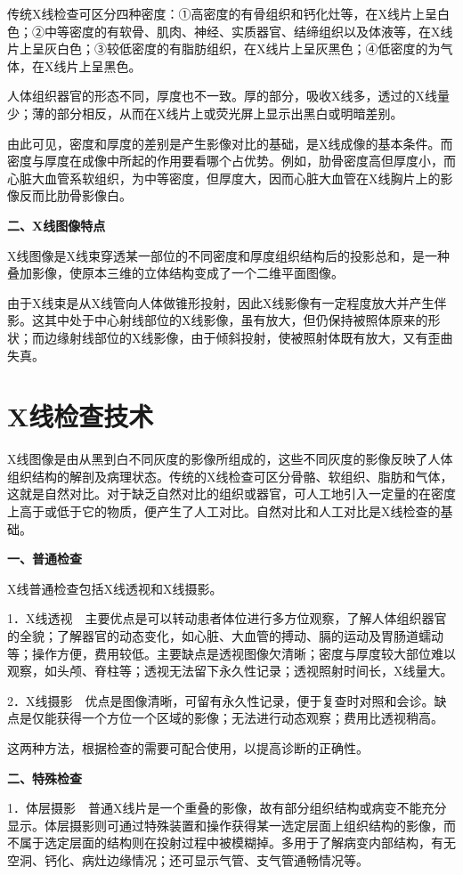 传统X线检查可区分四种密度：①高密度的有骨组织和钙化灶等，在X线片上呈白色；②中等密度的有软骨、肌肉、神经、实质器官、结缔组织以及体液等，在X线片上呈灰白色；③较低密度的有脂肪组织，在X线片上呈灰黑色；④低密度的为气体，在X线片上呈黑色。

人体组织器官的形态不同，厚度也不一致。厚的部分，吸收X线多，透过的X线量少；薄的部分相反，从而在X线片上或荧光屏上显示出黑白或明暗差别。

由此可见，密度和厚度的差别是产生影像对比的基础，是X线成像的基本条件。而密度与厚度在成像中所起的作用要看哪个占优势。例如，肋骨密度高但厚度小，而心脏大血管系软组织，为中等密度，但厚度大，因而心脏大血管在X线胸片上的影像反而比肋骨影像白。

\textbf{二、X线图像特点}

X线图像是X线束穿透某一部位的不同密度和厚度组织结构后的投影总和，是一种叠加影像，使原本三维的立体结构变成了一个二维平面图像。

由于X线束是从X线管向人体做锥形投射，因此X线影像有一定程度放大并产生伴影。这其中处于中心射线部位的X线影像，虽有放大，但仍保持被照体原来的形状；而边缘射线部位的X线影像，由于倾斜投射，使被照射体既有放大，又有歪曲失真。

\section{X线检查技术}

X线图像是由从黑到白不同灰度的影像所组成的，这些不同灰度的影像反映了人体组织结构的解剖及病理状态。传统的X线检查可区分骨骼、软组织、脂肪和气体，这就是自然对比。对于缺乏自然对比的组织或器官，可人工地引入一定量的在密度上高于或低于它的物质，便产生了人工对比。自然对比和人工对比是X线检查的基础。

\textbf{一、普通检查}

X线普通检查包括X线透视和X线摄影。

1．X线透视　主要优点是可以转动患者体位进行多方位观察，了解人体组织器官的全貌；了解器官的动态变化，如心脏、大血管的搏动、膈的运动及胃肠道蠕动等；操作方便，费用较低。主要缺点是透视图像欠清晰；密度与厚度较大部位难以观察，如头颅、脊柱等；透视无法留下永久性记录；透视照射时间长，X线量大。

2．X线摄影　优点是图像清晰，可留有永久性记录，便于复查时对照和会诊。缺点是仅能获得一个方位一个区域的影像；无法进行动态观察；费用比透视稍高。

这两种方法，根据检查的需要可配合使用，以提高诊断的正确性。

\textbf{二、特殊检查}

1．体层摄影　普通X线片是一个重叠的影像，故有部分组织结构或病变不能充分显示。体层摄影则可通过特殊装置和操作获得某一选定层面上组织结构的影像，而不属于选定层面的结构则在投射过程中被模糊掉。多用于了解病变内部结构，有无空洞、钙化、病灶边缘情况；还可显示气管、支气管通畅情况等。

